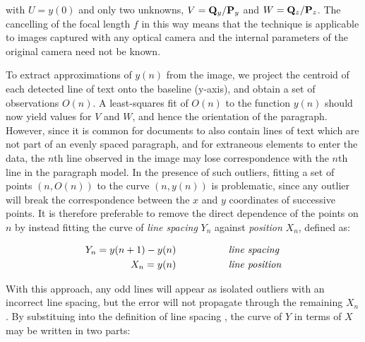 { \parindent 0mm
with $U=y(0)$ and only two unknowns,
$V = {{ \bf Q }_y}/{{ \bf P }_y}$ and $W = {{ \bf Q }_z}/{{ \bf P }_z}$.
The cancelling of the focal length $f$ in this way means that the technique is applicable to images captured with any optical camera and the internal parameters of the original camera need not be known.

To extract approximations of $y(n)$ from the image, we project the centroid of
each detected line of text onto the baseline (y-axis), and obtain a set of
observations $O(n)$. 
A least-squares fit of $O(n)$ to the function $y(n)$ should now yield values for $V$ and $W$, and hence the orientation of the paragraph.
However, since it is common for documents to also contain lines of text which are not part of an evenly spaced paragraph, and for extraneous elements to enter the data, the $n$th line observed in the image may lose correspondence with the $n$th line in the paragraph model.
In the presence of such outliers, fitting a set of points $(n,O(n))$ to the curve $(n,y(n))$ 
is problematic, since any outlier will break the correspondence between the $x$
and $y$ coordinates of successive points.
It is therefore preferable to remove the direct dependence of the points on $n$
by instead fitting the curve of {\em line spacing} $Y_n$ against {\em position} $X_n$, defined as:

\begin{eqnarray}
Y_n = y(n+1)-y(n) & \mbox{~~~~~~~~~~~~~~~ \it line spacing} \label{linespacingsdefneqn} \\
X_n = y(n) & \mbox{~~~~~~~~~~~~~~~ \it line position} \label{linepositiondefneqn}
\end{eqnarray}

With this approach, any odd lines will appear as isolated outliers with an incorrect line spacing, but the error will not propagate through the remaining $X_n$. %
By substituing  into the definition of line spacing , the curve of $Y$ in terms of $X$ may be written in two parts:
}

